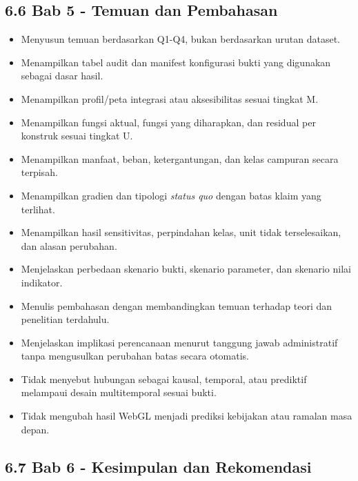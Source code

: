 \documentclass[
  indonesian,
  11pt,
]{article}
\providecommand{\tightlist}{%
  \setlength{\itemsep}{0pt}\setlength{\parskip}{0pt}}
\renewcommand{\tightlist}{%
  \setlength{\itemsep}{0.22em}%
  \setlength{\parskip}{0pt}%
}
\begin{document}
\subsection{6.6 Bab 5 - Temuan dan
Pembahasan}\label{bab-5---temuan-dan-pembahasan}

\begin{itemize}
\tightlist
\item[$\square$]
  Menyusun temuan berdasarkan Q1-Q4, bukan berdasarkan urutan dataset.
\item[$\square$]
  Menampilkan tabel audit dan manifest konfigurasi bukti yang digunakan
  sebagai dasar hasil.
\item[$\square$]
  Menampilkan profil/peta integrasi atau aksesibilitas sesuai tingkat M.
\item[$\square$]
  Menampilkan fungsi aktual, fungsi yang diharapkan, dan residual per
  konstruk sesuai tingkat U.
\item[$\square$]
  Menampilkan manfaat, beban, ketergantungan, dan kelas campuran secara
  terpisah.
\item[$\square$]
  Menampilkan gradien dan tipologi \emph{status quo} dengan batas klaim
  yang terlihat.
\item[$\square$]
  Menampilkan hasil sensitivitas, perpindahan kelas, unit tidak
  terselesaikan, dan alasan perubahan.
\item[$\square$]
  Menjelaskan perbedaan skenario bukti, skenario parameter, dan skenario
  nilai indikator.
\item[$\square$]
  Menulis pembahasan dengan membandingkan temuan terhadap teori dan
  penelitian terdahulu.
\item[$\square$]
  Menjelaskan implikasi perencanaan menurut tanggung jawab administratif
  tanpa mengusulkan perubahan batas secara otomatis.
\item[$\square$]
  Tidak menyebut hubungan sebagai kausal, temporal, atau prediktif
  melampaui desain multitemporal sesuai bukti.
\item[$\square$]
  Tidak mengubah hasil WebGL menjadi prediksi kebijakan atau ramalan
  masa depan.
\end{itemize}

\subsection{6.7 Bab 6 - Kesimpulan dan
Rekomendasi}\label{bab-6---kesimpulan-dan-rekomendasi}
\end{document}
